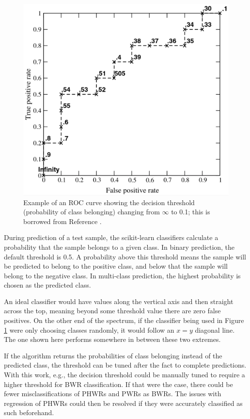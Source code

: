 \begin{figure}[!htb]
  \centering
  \includegraphics[width=0.8\linewidth]{./chapters/concl/roc.png}
  \caption[Example of an \acrshort{ROC} curve]
          {Example of an \acrshort{ROC} curve showing the decision threshold 
           (probability of class belonging) changing from $\infty$ to 0.1; this 
           is borrowed from Reference \cite{roc}.}
  \label{fig:roc}
\end{figure}

During prediction of a test sample, the scikit-learn classifiers calculate a
probability that the sample belongs to a given class. In binary prediction, the
default threshold is 0.5. A probability above this threshold means the sample
will be predicted to belong to the positive class, and below that the sample
will belong to the negative class.  In multi-class prediction, the highest
probability is chosen as the predicted class.

An ideal classifier would have values along the vertical axis and then straight
across the top, meaning beyond some threshold value there are zero false
positives. On the other end of the spectrum, if the classifier being used in
Figure \ref{fig:roc} were only choosing classes randomly, it would follow an
$x=y$ diagonal line. The one shown here performs somewhere in between these two
extremes. 

If the algorithm returns the probabilities of class belonging instead of the
predicted class, the threshold can be tuned after the fact to complete
predictions.  With this work, e.g., the decision threshold  could be manually
tuned to require a higher threshold for \gls{BWR} classification. If that were
the case, there could be fewer misclassifications of \glspl{PHWR} and
\glspl{PWR} as \glspl{BWR}. The issues with regression of \glspl{PHWR} could
then be resolved if they were accurately classified as such beforehand. 

